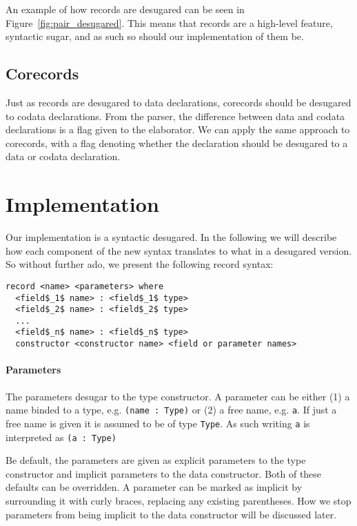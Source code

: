 An example of how records are desugared can be seen in
Figure~\ref{fig:pair_desugared}. This means that records are a high-level feature, syntactic sugar, and
as such so should our implementation of them be.

\subsection{Corecords}
Just as records are desugared to data declarations, corecords should be
desugared to codata declarations. From the parser, the difference between data and
codata declarations is a flag given to the elaborator. We can apply the same
approach to corecords, with a flag denoting whether the declaration should be
desugared to a data or codata declaration. 

\section{Implementation}
Our implementation is a syntactic desugared. In the following we will describe
how each component of the new syntax translates to what in a desugared
version. So without further ado, we present the following record syntax: 

\begin{lstlisting}[mathescape]
record <name> <parameters> where
  <field$_1$ name> : <field$_1$ type>
  <field$_2$ name> : <field$_2$ type>
  ...
  <field$_n$ name> : <field$_n$ type>
  constructor <constructor name> <field or parameter names>
\end{lstlisting}

\paragraph{Parameters}
The parameters desugar to the type constructor. A parameter can be either (1) a
name binded to a type, e.g. \texttt{(name : Type)} or (2) a free name,
e.g. \texttt{a}. If just a free name is given it is assumed to be of type
\texttt{Type}. As such writing \texttt{a} is interpreted as \texttt{(a : Type)}

Be default, the parameters are given as explicit parameters to the type
constructor and implicit parameters to the data constructor. Both of these
defaults can be overridden. A parameter can be marked as implicit by
surrounding it with curly braces, replacing any existing parentheses. How we
stop parameters from being implicit to the data constructor will be discussed later.

